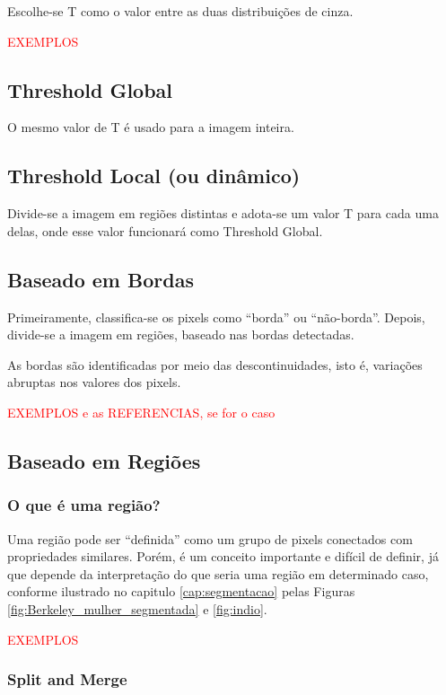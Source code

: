 Escolhe-se T como o valor entre as duas distribuições de cinza.

\textcolor{red}{EXEMPLOS}

\subsection*{Threshold Global}
O mesmo valor de T é usado para a imagem inteira.

\subsection*{Threshold Local (ou dinâmico)}
Divide-se a imagem em regiões distintas e adota-se um valor T para cada uma delas, onde esse valor funcionará como Threshold Global.

\subsection{Baseado em Bordas}
Primeiramente, classifica-se os pixels como “borda” ou “não-borda”.
Depois, divide-se a imagem em regiões, baseado nas bordas detectadas.

As bordas são identificadas por meio das descontinuidades, isto é, variações abruptas nos valores dos pixels. 

\textcolor{red}{EXEMPLOS e as REFERENCIAS, se for o caso}


\subsection{Baseado em Regiões}
\subsubsection*{O que é uma região?}
Uma região pode ser “definida” como um grupo de pixels conectados com propriedades similares.
Porém, é um conceito importante e difícil de definir, já que depende da interpretação do que seria uma região  em determinado caso, conforme ilustrado no capitulo \ref{cap:segmentacao} pelas Figuras \ref{fig:Berkeley_mulher_segmentada} e \ref{fig:indio}.

\textcolor{red}{EXEMPLOS}

\subsubsection{Split and Merge}
